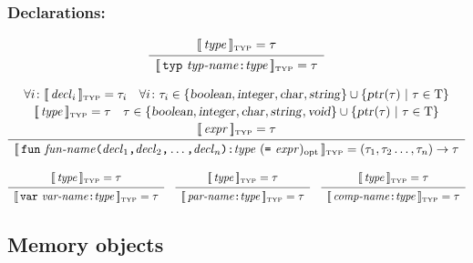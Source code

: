 \documentclass[10pt]{article}
\begin{document}
\subsubsection{Declarations:}

$$ \begin{array}{c}
   [\![\,\mbox{\textit{type}}\,]\!]_{\mbox{\tiny TYP}} = \tau
   \\[2pt]\hline\\[-10pt]
   [\![\,\mbox{\texttt{typ}}\ \mbox{\textit{typ-name}}\mbox{\texttt{:}}\mbox{\textit{type}}\,]\!]_{\mbox{\tiny TYP}} = \tau
   \end{array} $$

$$ \begin{array}{c}
   \forall i\colon \typattr{\nont{decl}_i} = \tau_i \quad
   \forall i\colon \tau_i \in \{\type{boolean},\type{integer},\type{char},\type{string}\} \cup \{\type{ptr}(\tau)\ | \ \tau \in \mbox{T} \} \\[2pt]
   \typattr{\nont{type}} = \tau \quad
   \tau \in \{\type{boolean},\type{integer},\type{char},\type{string},\type{void}\} \cup \{\type{ptr}(\tau)\ | \ \tau \in \mbox{T} \} \\[2pt]
   \typattr{\nont{expr}} = \tau
   \\[2pt]\hline\\[-10pt]
   \typattr{\term{fun}\ \nont{fun-name}\term{(}\nont{decl}_1\term{,}\nont{decl}_2\term{,}\ldots\term{,}\nont{decl}_n\term{)}\term{:}\nont{type}\ (\term{=}\ \nont{expr})_\mathrm{opt}} = (\tau_1,\tau_2\ldots,\tau_n)\rightarrow\tau
   \end{array} $$

$$ \begin{array}{c}
   \typattr{\nont{type}} = \tau
   \\[2pt]\hline\\[-10pt]
   \typattr{\term{var}\ \nont{var-name}\term{:}\nont{type}} = \tau
   \end{array}
  \quad
   \begin{array}{c}
   \typattr{\nont{type}} = \tau
   \\[2pt]\hline\\[-10pt]
   \typattr{\nont{par-name}\term{:}\nont{type}} = \tau
   \end{array}
  \quad
   \begin{array}{c}
   \typattr{\nont{type}} = \tau
   \\[2pt]\hline\\[-10pt]
   \typattr{\nont{comp-name}\term{:}\nont{type}} = \tau
   \end{array} $$

\subsection{Memory objects}
\end{document}
